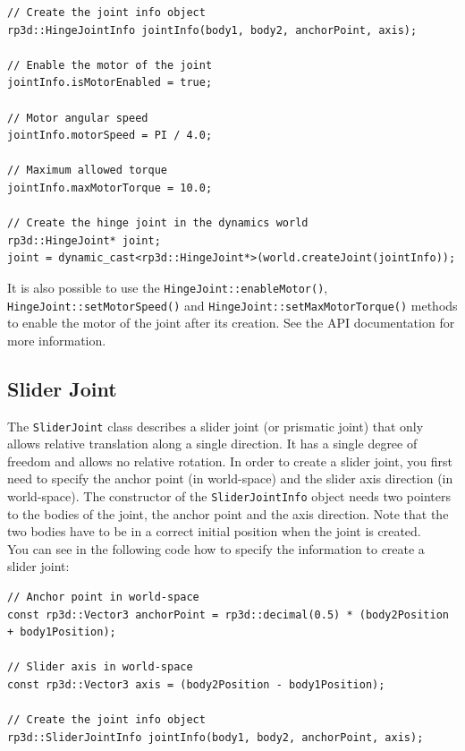 \documentclass[a4paper,12pt]{article}
\begin{document}
     \begin{lstlisting}
// Create the joint info object
rp3d::HingeJointInfo jointInfo(body1, body2, anchorPoint, axis);

// Enable the motor of the joint
jointInfo.isMotorEnabled = true;

// Motor angular speed
jointInfo.motorSpeed = PI / 4.0;

// Maximum allowed torque
jointInfo.maxMotorTorque = 10.0;

// Create the hinge joint in the dynamics world
rp3d::HingeJoint* joint;
joint = dynamic_cast<rp3d::HingeJoint*>(world.createJoint(jointInfo));
  \end{lstlisting}

     \vspace{0.6cm}

     \begin{sloppypar}
        It is also possible to use the \texttt{HingeJoint::enableMotor()}, \texttt{HingeJoint::setMotorSpeed()} and \texttt{HingeJoint::setMaxMotorTorque()} methods to
        enable the motor of the joint after its creation. See the API documentation for more information.
     \end{sloppypar}

    \subsection{Slider Joint}

    The \texttt{SliderJoint} class describes a slider joint (or prismatic joint) that only allows relative translation along a single direction. It has a single degree of freedom and allows no
    relative rotation. In order to create a slider joint, you first need to specify the anchor point (in world-space) and the slider axis direction (in world-space). The constructor of the
    \texttt{SliderJointInfo} object needs two pointers to the bodies of the joint, the anchor point and the axis direction. Note that the two bodies have to be in a correct initial position when
    the joint is created. \\

    You can see in the following code how to specify the information to create a slider joint: \\

    \begin{lstlisting}
// Anchor point in world-space
const rp3d::Vector3 anchorPoint = rp3d::decimal(0.5) * (body2Position + body1Position);

// Slider axis in world-space
const rp3d::Vector3 axis = (body2Position - body1Position);

// Create the joint info object
rp3d::SliderJointInfo jointInfo(body1, body2, anchorPoint, axis);
  \end{lstlisting}
\end{document}
